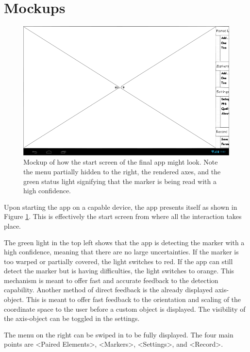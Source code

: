 \section{Mockups}

\begin{figure}
	\centering
	\includegraphics[width=15cm]{img/main_nomenu.png}
	\caption[Start screen mockup.]{Mockup of how the start screen of the final app might look. Note the menu partially hidden to the right, the rendered axes, and the green status light signifying that the marker is being read with a high confidence.}
	\label{fig:main_nomenu}
\end{figure}

Upon starting the app on a capable device, the app presents itself as shown in Figure \ref{fig:main_nomenu}.
This is effectively the start screen from where all the interaction takes place.

The green light in the top left shows that the app is detecting the marker with a high confidence, meaning that there are no large uncertainties.
If the marker is too warped or partially covered, the light switches to red.
If the app can still detect the marker but is having difficulties, the light switches to orange.
This mechanism is meant to offer fast and accurate feedback to the detection capability.
Another method of direct feedback is the already displayed axis-object.
This is meant to offer fast feedback to the orientation and scaling of the coordinate space to the user before a custom object is displayed.
The visibility of the axis-object can be toggled in the settings.

The menu on the right can be swiped in to be fully displayed.
The four main points are <Paired Elements>, <Markers>, <Settings>, and <Record>.


